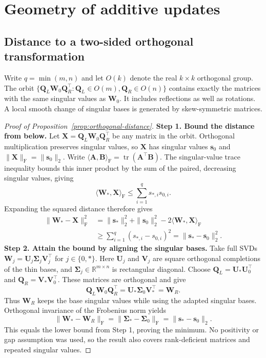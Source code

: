 \section{Geometry of additive updates}\label{app:geometry}
\subsection{Distance to a two-sided orthogonal transformation}
Write $q=\min(m,n)$ and let $O(k)$ denote the real $k\times k$ orthogonal group. The orbit $\{\bm Q_L\bm W_0\bm Q_R^{\!\top}:\bm Q_L\in O(m),\bm Q_R\in O(n)\}$ contains exactly the matrices with the same singular values as $\bm W_0$. It includes reflections as well as rotations. A local smooth change of singular bases is generated by skew-symmetric matrices.

\begin{proof}[Proof of Proposition~\ref{prop:orthogonal-distance}]
\textbf{Step 1. Bound the distance from below.} Let $\bm X=\bm Q_L\bm W_0\bm Q_R^{\!\top}$ be any matrix in the orbit. Orthogonal multiplication preserves singular values, so $\bm X$ has singular values $\bm s_0$ and $\|\bm X\|_{\mathrm F}=\|\bm s_0\|_2$. Write $\langle\bm A,\bm B\rangle_{\mathrm F}=\operatorname{tr}(\bm A^{\!\top}\bm B)$. The singular-value trace inequality \citep{mirsky1975trace} bounds this inner product by the sum of the paired, decreasing singular values, giving
\begin{equation*}
\langle\bm W_*,\bm X\rangle_{\mathrm F}\leq\sum_{i=1}^q s_{*,i}s_{0,i}.
\end{equation*}
Expanding the squared distance therefore gives
\begin{equation*}
\begin{aligned}
\|\bm W_*-\bm X\|_{\mathrm F}^2
&=\|\bm s_*\|_2^2+\|\bm s_0\|_2^2-2\langle\bm W_*,\bm X\rangle_{\mathrm F}\\
&\geq\sum_{i=1}^q(s_{*,i}-s_{0,i})^2=\|\bm s_*-\bm s_0\|_2^2.
\end{aligned}
\end{equation*}
\textbf{Step 2. Attain the bound by aligning the singular bases.} Take full SVDs $\bm W_j=\bm U_j\bm\Sigma_j\bm V_j^{\!\top}$ for $j\in\{0,*\}$. Here $\bm U_j$ and $\bm V_j$ are square orthogonal completions of the thin bases, and $\bm\Sigma_j\in\mathbb R^{m\times n}$ is rectangular diagonal. Choose $\bm Q_L=\bm U_*\bm U_0^{\!\top}$ and $\bm Q_R=\bm V_*\bm V_0^{\!\top}$. These matrices are orthogonal and give
\begin{equation*}
\bm Q_L\bm W_0\bm Q_R^{\!\top}=\bm U_*\bm\Sigma_0\bm V_*^{\!\top}=\bm W_R.
\end{equation*}
Thus $\bm W_R$ keeps the base singular values while using the adapted singular bases. Orthogonal invariance of the Frobenius norm yields
\begin{equation*}
\|\bm W_*-\bm W_R\|_{\mathrm F}
=\|\bm\Sigma_*-\bm\Sigma_0\|_{\mathrm F}
=\|\bm s_*-\bm s_0\|_2.
\end{equation*}
This equals the lower bound from Step 1, proving the minimum. No positivity or gap assumption was used, so the result also covers rank-deficient matrices and repeated singular values.


\end{proof}
